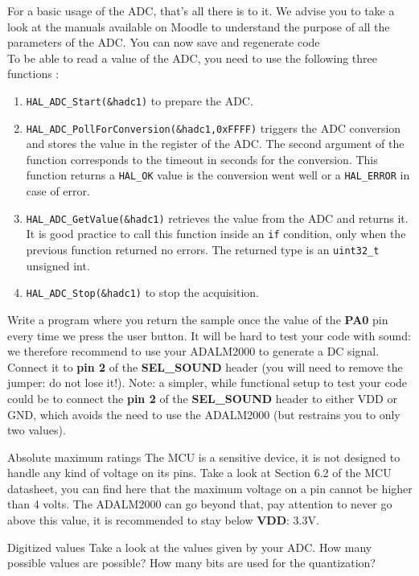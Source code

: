 For a basic usage of the ADC, that's all there is to it. We advise you to take a look at the manuals available on Moodle to understand the purpose of all the parameters of the ADC. You can now save and regenerate code \\

\noindent To be able to read a value of the ADC, you need to use the following three functions :
\begin{enumerate}
    \item \texttt{HAL\_ADC\_Start(\&hadc1)} to prepare the ADC.
    \item \texttt{HAL\_ADC\_PollForConversion(\&hadc1,0xFFFF)} triggers the ADC conversion and stores the value in the register of the ADC. The second argument of the function corresponds to the timeout in seconds for the conversion. This function returns a \texttt{HAL\_OK} value is the conversion went well or a \texttt{HAL\_ERROR} in case of error.
    \item \texttt{HAL\_ADC\_GetValue(\&hadc1)} retrieves the value from the ADC and returns it. It is good practice to call this function inside an \texttt{if} condition, only when the previous function returned no errors. The returned type is an \texttt{uint32\_t} unsigned int.
    \item \texttt{HAL\_ADC\_Stop(\&hadc1)} to stop the acquisition.
 \end{enumerate}

\noindent Write a program where you return the sample once the value of the \textbf{PA0} pin every time we press the user button. It will be hard to test your code with sound: we therefore recommend to use your ADALM2000 to generate a DC signal. Connect it to \textbf{pin 2} of the \textbf{SEL\_SOUND} header (you will need to remove the jumper: do not lose it!). Note: a simpler, while functional setup to test your code could be to connect the \textbf{pin 2} of the \textbf{SEL\_SOUND} header to either VDD or GND, which avoids the need to use the ADALM2000 (but restrains you to only two values). \\
\begin{bclogo}[couleur = gray!20, arrondi = 0.2, logo=\bcattention]{Absolute maximum ratings}
The MCU is a sensitive device, it is not designed to handle any kind of voltage on its pins. Take a look at Section 6.2 of the MCU datasheet, you can find here that the maximum voltage on a pin cannot be higher than 4 volts. The ADALM2000 can go beyond that, pay attention to never go above this value, it is recommended to stay below \textbf{VDD}: 3.3V.
\end{bclogo}
\begin{bclogo}[couleur = gray!20, arrondi = 0.2, logo=\bcquestion]{Digitized values}
Take a look at the values given by your ADC. How many possible values are possible? How many bits are used for the quantization?
\end{bclogo}

